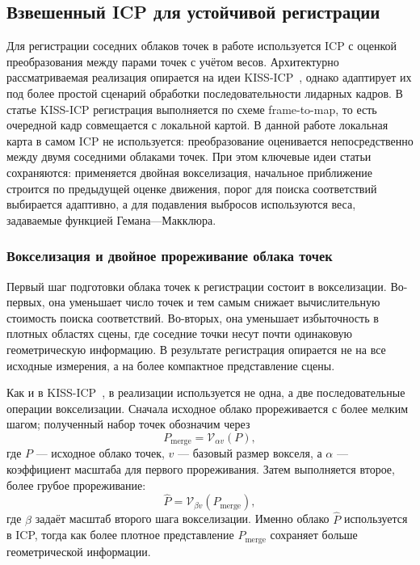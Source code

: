 \subsection{Взвешенный ICP для устойчивой регистрации}
\label{sec:2-3-icp-weighting}

Для регистрации соседних облаков точек в работе используется ICP с оценкой преобразования между парами точек с учётом весов. Архитектурно рассматриваемая реализация опирается на идеи KISS-ICP~\cite{kiss-icp}, однако адаптирует их под более простой сценарий обработки последовательности лидарных кадров. В статье KISS-ICP регистрация выполняется по схеме frame-to-map, то есть очередной кадр совмещается с локальной картой. В данной работе локальная карта в самом ICP не используется: преобразование оценивается непосредственно между двумя соседними облаками точек. При этом ключевые идеи статьи сохраняются: применяется двойная вокселизация, начальное приближение строится по предыдущей оценке движения, порог для поиска соответствий выбирается адаптивно, а для подавления выбросов используются веса, задаваемые функцией Гемана---Макклюра.

\subsubsection{Вокселизация и двойное прореживание облака точек}

Первый шаг подготовки облака точек к регистрации состоит в вокселизации. Во-первых, она уменьшает число точек и тем самым снижает вычислительную стоимость поиска соответствий. Во-вторых, она уменьшает избыточность в плотных областях сцены, где соседние точки несут почти одинаковую геометрическую информацию. В результате регистрация опирается не на все исходные измерения, а на более компактное представление сцены.

Как и в KISS-ICP~\cite{kiss-icp}, в реализации используется не одна, а две последовательные операции вокселизации. Сначала исходное облако прореживается с более мелким шагом; полученный набор точек обозначим через
\begin{equation}
    P_{\mathrm{merge}} = \mathcal{V}_{\alpha v}(P),
\end{equation}
где \(P\) --- исходное облако точек, \(v\) --- базовый размер вокселя, а \(\alpha\) --- коэффициент масштаба для первого прореживания. Затем выполняется второе, более грубое прореживание:
\begin{equation}
    \hat{P} = \mathcal{V}_{\beta v}(P_{\mathrm{merge}}),
\end{equation}
где \(\beta\) задаёт масштаб второго шага вокселизации. Именно облако \(\hat{P}\) используется в ICP, тогда как более плотное представление \(P_{\mathrm{merge}}\) сохраняет больше геометрической информации.


